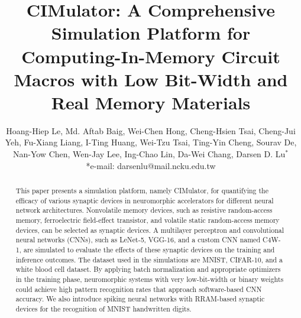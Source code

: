 \documentclass[journal]{IEEEtran}
\begin{document}
\title{CIMulator: A Comprehensive Simulation Platform for Computing-In-Memory Circuit Macros with Low Bit-Width and Real Memory Materials}


\author{Hoang-Hiep Le, Md. Aftab Baig,  Wei-Chen Hong, Cheng-Hsien Tsai, Cheng-Jui Yeh, Fu-Xiang Liang, I-Ting Huang, Wei-Tzu Tsai, Ting-Yin Cheng, Sourav De, Nan-Yow Chen, Wen-Jay Lee, Ing-Chao Lin, Da-Wei Chang, Darsen D. Lu$^*$

*e-mail: darsenlu@mail.ncku.edu.tw}






\maketitle


\begin{abstract}
This paper presents a simulation platform, namely CIMulator, for quantifying the efficacy of various synaptic devices in neuromorphic accelerators for different neural network architectures. Nonvolatile memory devices, such as resistive random-access memory, ferroelectric field-effect transistor, and volatile static random-access memory devices, can be selected as synaptic devices. A multilayer perceptron and convolutional neural networks (CNNs), such as LeNet-5, VGG-16, and a custom CNN named C4W-1, are simulated to evaluate the effects of these synaptic devices on the training and inference outcomes. 
The dataset used in the simulations are MNIST, CIFAR-10, and a white blood cell dataset. By applying batch normalization and appropriate optimizers in the training phase, neuromorphic systems with very low-bit-width or binary weights could achieve high pattern recognition rates that approach software-based CNN accuracy. We also introduce spiking neural networks with RRAM-based synaptic devices for the recognition of MNIST handwritten digits.
\end{abstract}
\end{document}
